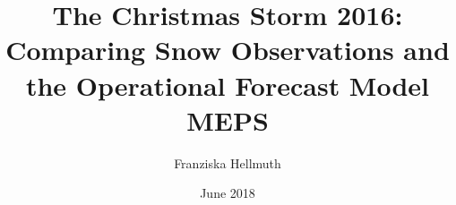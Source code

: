 \makeatletter
\title{The Christmas Storm 2016: Comparing Snow Observations and the Operational Forecast Model MEPS}	\let\Title\@title
\author{Franziska Hellmuth}	\let\Author\@author
\date{June 2018}		\let\Date\@date
\makeatother